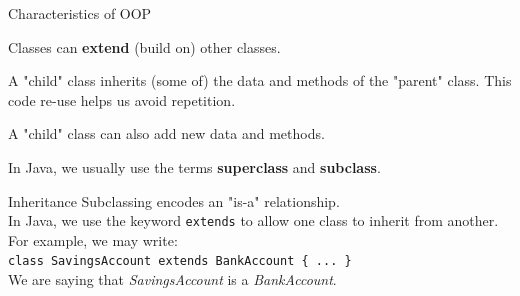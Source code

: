 \documentclass[aspectratio=169]{beamer}
\newenvironment{deflist}
{ \begin{description}
    \setlength{\itemsep}{6pt}
    \setlength{\parskip}{0pt}
    \setlength{\parsep}{0pt}     }
{ \end{description}                  }
\begin{document}
\begin{frame}{Characteristics of OOP}
	\begin{deflist}
		\item[Inheritance]
		Classes can \textbf{extend} (build on) other classes.
		\item[] A "child" class inherits (some of) the data and methods of the "parent" class. This code re-use helps us avoid repetition.
		\item[] A "child" class can also add new data and methods.
		\item[] In Java, we usually use the terms \textbf{superclass} and \textbf{subclass}.
	\end{deflist}
\end{frame}




\begin{frame}[fragile]{Inheritance}
Subclassing encodes an "is-a" relationship. \\
\vspace{1em}
In Java, we use the keyword \texttt{extends} to allow one class to inherit from another. For example, we may write: \\ 
\vspace{1em}
\texttt{class SavingsAccount extends BankAccount \{ ... \}} \\
\vspace{1em}
We are saying that \textit{SavingsAccount} is a \textit{BankAccount}. \\
\end{frame}
\end{document}
